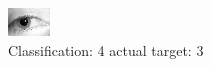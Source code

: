 \begin{figure}[h!]
\begin{center}
\includegraphics[width=0.60\columnwidth]{figures/ID1292_class_4_target_3.png}
\end{center}
\caption{ Classification: 4 actual target: 3}
\label{fig:ID1292_class_4_target_3}
\end{figure}
